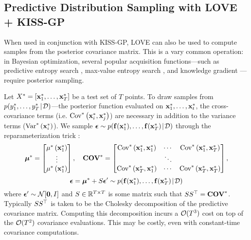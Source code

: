\subsection{Predictive Distribution Sampling with LOVE{} + KISS-GP}
\label{sec:sampling_method}

When used in conjunction with KISS-GP, LOVE{} can also be used to compute samples from the posterior covariance matrix.
This is a vary common operation: in Bayesian optimization, several popular acquisition functions---such as predictive entropy search \cite{hernandez2014predictive}, max-value entropy search \cite{wang2017max}, and knowledge gradient \cite{frazier2009knowledge}---require posterior sampling.

Let $X^* = [ \mathbf{x}^*_1, \ldots, \mathbf{x}^*_T ]$ be a test set of $T$ points.
To draw samples from $p( y^*_1, \ldots, y^*_T  \! \mid \! \mathcal D)$---the posterior function evaluated on $\mathbf{x}^*_1, \ldots, \mathbf{x}^*_t$,
the cross-covariance terms (i.e. $\text{Cov}^* \left( \mathbf{x}^*_i, \mathbf{x}^*_j \right)$) are necessary in addition to the variance terms ($\text{Var}^* \left( \mathbf{x}^*_i \right)$).
We sample $\boldsymbol{\epsilon} \sim p( \mathbf{f}(\mathbf{x}^*_1), \ldots, \mathbf{f}(\mathbf{x}^*_T) \! \mid \! \mathcal D)$ through the reparameterization trick \cite{kingma2014auto,rezende2014stochastic}:
%
\[
  \boldsymbol{\mu}^* = \begin{bmatrix} \mu^* \left( \mathbf{x}^*_1 \right) \\ \vdots \\ \mu^* \left( \mathbf{x}^*_1 \right) \end{bmatrix},
  \quad
  \textbf{COV}^* = \begin{bmatrix}
    \text{Cov}^* \left( \mathbf{x}^*_1, \mathbf{x}^*_1 \right) & \cdots & \text{Cov}^* \left( \mathbf{x}^*_1, \mathbf{x}^*_T \right) \\
    & \ddots & \\
    \text{Cov}^* \left( \mathbf{x}^*_T, \mathbf{x}^*_1 \right) & \cdots & \text{Cov}^* \left( \mathbf{x}^*_T, \mathbf{x}^*_T \right) \\
  \end{bmatrix},
\]
\begin{equation}
  \boldsymbol{\epsilon} = \boldsymbol{\mu}^* + S \boldsymbol{\epsilon}' \sim p( \mathbf{f}(\mathbf{x}^*_1), \ldots, \mathbf{f}(\mathbf{x}^*_T) \! \mid \! \mathcal D)
  \label{eqn:sample}
\end{equation}
%
where $\bepsilon' \sim \normaldist{\bzero}{\bI}$ and $S \in \mathbb{R}^{T \times T}$ is some matrix such that $S S^\top = \textbf{COV}^*$.
Typically $S S^\top$ is taken to be the Cholesky decomposition of the predictive covariance matrix.
Computing this decomposition incurs a $\bigo{T^3}$ cost on top of the $\bigo{T^2}$ covariance evaluations.
This may be costly, even with constant-time covariance computations.


